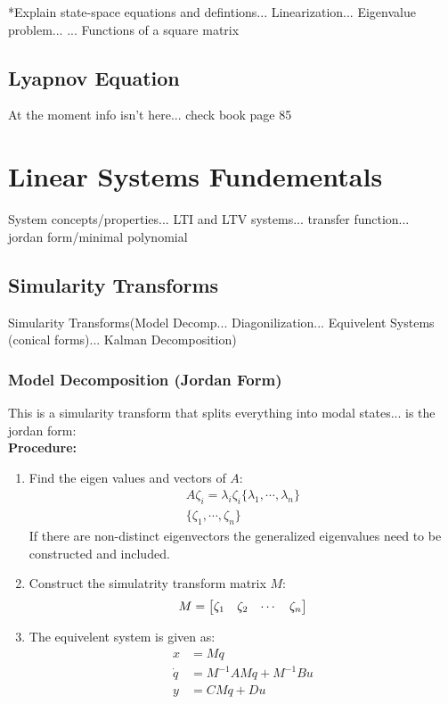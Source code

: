 \documentclass[]{article}
\begin{document}
*Explain state-space equations and defintions... Linearization...  Eigenvalue problem... ... Functions of a square matrix\\

	\subsection*{Lyapnov Equation}
	At the moment info isn't here... check book page 85


\section*{Linear Systems Fundementals}
System concepts/properties... LTI and LTV systems... transfer function...\\
jordan form/minimal polynomial\\



	\subsection*{Simularity Transforms}
		Simularity Transforms(Model Decomp... Diagonilization... Equivelent Systems (conical forms)... Kalman Decomposition)\\
		\subsubsection*{Model Decomposition (Jordan Form)}
			This is a simularity transform that splits everything into modal states... is the jordan form:\\
			\textbf{Procedure:}\\
			\begin{enumerate}
				\item Find the eigen values and vectors of $A$:
				\begin{align*}
					A \zeta_i = \lambda_i \zeta_i
					\{\lambda_1,\cdots,\lambda_n\}\\
					\{\zeta_1,\cdots,\zeta_n\}
				\end{align*}
				If there are non-distinct eigenvectors the generalized eigenvalues need to be constructed and included.
				\item Construct the simulatrity transform matrix $M$:
				\begin{displaymath}
					M = \mqty[\zeta_1 & \zeta_2 & \cdots & \zeta_n]
				\end{displaymath}
				\item The equivelent system is given as:
				\begin{align*}
					x &= M q\\
					\dot{q} &= M^{-1} A M q + M^{-1} B u\\
					y &= C M q + D u
				\end{align*}
			\end{enumerate}
\end{document}
